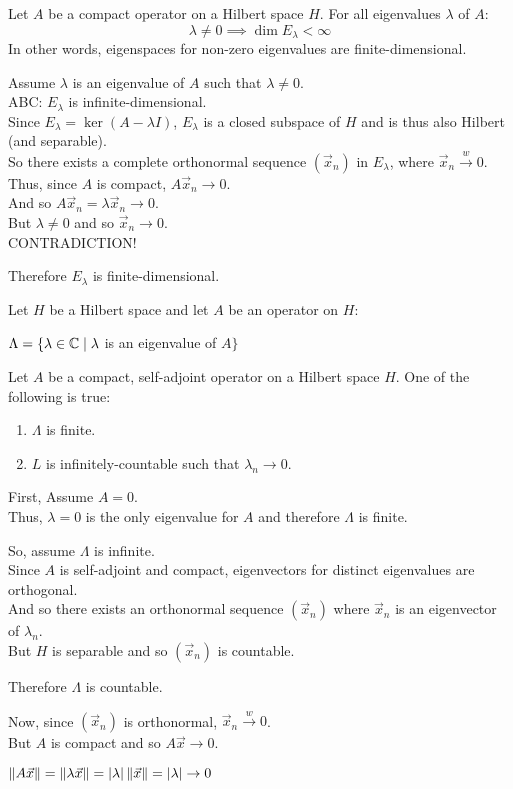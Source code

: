 \documentclass[letterpaper,12pt,fleqn]{article}
\renewcommand{\l}{\lambda}
\renewcommand{\L}{\Lambda}
\newcommand{\norm}[1]{\left\|#1\right\|}
\newcommand{\weak}{\overset{w}{\longrightarrow}}
\newcommand{\vx}{\vec{x}}
\begin{document}
\begin{theorem}
  Let $A$ be a compact operator on a Hilbert space $H$.
  For all eigenvalues $\l$ of $A$:
  \[\l\ne0\implies\dim E_{\l}<\infty\]
  In other words, eigenspaces for non-zero eigenvalues are finite-dimensional.
\end{theorem}

\begin{theproof}
  Assume $\l$ is an eigenvalue of $A$ such that $\l\ne0$. \\
  ABC: $E_{\l}$ is infinite-dimensional. \\
  Since $E_{\l}=\ker(A-\l I)$, $E_{\l}$ is a closed subspace of $H$ and is thus
  also Hilbert (and separable). \\
  So there exists a complete orthonormal sequence $(\vx_n)$ in $E_{\l}$,
  where $\vx_n\weak0$. \\
  Thus, since $A$ is compact, $A\vx_n\to0$. \\
  And so $A\vx_n=\l\vx_n\to0$. \\
  But $\l\ne0$ and so $\vx_n\to0$. \\
  CONTRADICTION!

  Therefore $E_{\l}$ is finite-dimensional.
\end{theproof}

\begin{definition}
  Let $H$ be a Hilbert space and let $A$ be an operator on $H$:

  \qquad$\L=\{\l\in\C\mid\l$ is an eigenvalue of $A\}$
\end{definition}

\begin{theorem}
  Let $A$ be a compact, self-adjoint operator on a Hilbert space $H$. One
  of the following is true:
  \begin{enumerate}
  \item $\L$ is finite.
  \item $L$ is infinitely-countable such that $\l_n\to0$.
  \end{enumerate}
\end{theorem}

\begin{theproof}
  First, Assume $A=0$. \\
  Thus, $\l=0$ is the only eigenvalue for $A$ and therefore $\L$ is finite.

  So, assume $\L$ is infinite. \\
  Since $A$ is self-adjoint and compact, eigenvectors for distinct eigenvalues
  are orthogonal. \\
  And so there exists an orthonormal sequence $(\vx_n)$ where $\vx_n$ is
  an eigenvector of $\l_n$. \\
  But $H$ is separable and so $(\vx_n)$ is countable.

  Therefore $\L$ is countable.

  Now, since $(\vx_n)$ is orthonormal, $\vx_n\weak0$. \\
  But $A$ is compact and so $A\vx\to0$.

  $\norm{A\vx}=\norm{\l\vx}=\abs{\l}\norm{\vx}=\abs{\l}\to0$
\end{theproof}
\end{document}
